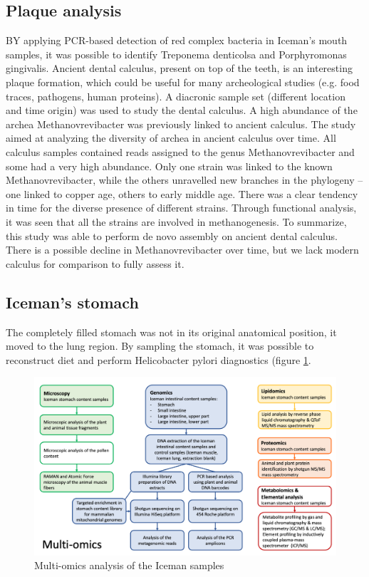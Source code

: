 	\subsection{Plaque analysis}
	BY applying PCR-based detection of red complex bacteria in Iceman’s mouth samples, it was possible to identify Treponema denticolsa and Porphyromonas gingivalis.
	Ancient dental calculus, present on top of the teeth, is an interesting plaque formation, which could be useful for many archeological studies (e.g. food traces, pathogens, human proteins).
	A diacronic sample set (different location and time origin) was used to study the dental calculus.
	A high abundance of the archea Methanovrevibacter was previously linked to ancient calculus.
	The study aimed at analyzing the diversity of archea in ancient calculus over time.
	All calculus samples contained reads assigned to the genus Methanovrevibacter and some had a very high abundance.
	Only one strain was linked to the known Methanovrevibacter, while the others unravelled new branches in the phylogeny – one linked to copper age, others to early middle age.
	There was a clear tendency in time for the diverse presence of different strains.
	Through functional analysis, it was seen that all the strains are involved in methanogenesis.
	To summarize, this study was able to perform de novo assembly on ancient dental calculus.
	There is a possible decline in Methanovrevibacter over time, but we lack modern calculus for comparison to fully assess it.

	\subsection{Iceman’s stomach}
	The completely filled stomach was not in its original anatomical position, it moved to the lung region.
	By sampling the stomach, it was possible to reconstruct diet and perform Helicobacter pylori diagnostics (figure \ref{fig:omics}.

	\begin{figure}
		\includegraphics[width=1\textwidth]{multiomics.png}
		\caption{\label{fig:omics} Multi-omics analysis of the Iceman samples}
	\end{figure}

